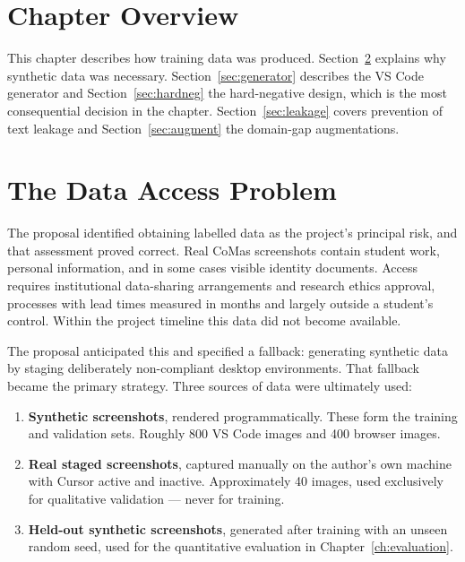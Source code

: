 \documentclass[12pt,oneside]{report}
\begin{document}
\section{Chapter Overview}

This chapter describes how training data was produced.
Section~\ref{sec:dataproblem} explains why synthetic data was necessary.
Section~\ref{sec:generator} describes the VS Code generator and
Section~\ref{sec:hardneg} the hard-negative design, which is the most
consequential decision in the chapter. Section~\ref{sec:leakage} covers
prevention of text leakage and Section~\ref{sec:augment} the domain-gap
augmentations.

\section{The Data Access Problem}
\label{sec:dataproblem}

The proposal identified obtaining labelled data as the project's principal risk,
and that assessment proved correct. Real CoMas screenshots contain student work,
personal information, and in some cases visible identity documents. Access
requires institutional data-sharing arrangements and research ethics approval,
processes with lead times measured in months and largely outside a student's
control. Within the project timeline this data did not become available.

The proposal anticipated this and specified a fallback: generating synthetic
data by staging deliberately non-compliant desktop environments. That fallback
became the primary strategy. Three sources of data were ultimately used:

\begin{enumerate}[itemsep=2pt]
  \item \textbf{Synthetic screenshots}, rendered programmatically. These form
        the training and validation sets. Roughly 800 VS Code images and 400
        browser images.
  \item \textbf{Real staged screenshots}, captured manually on the author's own
        machine with Cursor active and inactive. Approximately 40 images, used
        exclusively for qualitative validation --- never for training.
  \item \textbf{Held-out synthetic screenshots}, generated after training with
        an unseen random seed, used for the quantitative evaluation in
        Chapter~\ref{ch:evaluation}.
\end{enumerate}
\end{document}
